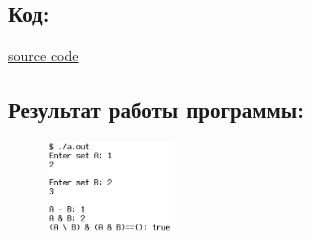 \documentclass[14pt,a4paper]{article}
\begin{document}
\subsection{Код:}

\href{https://raw.githubusercontent.com/John1400800/stuff/refs/heads/main/c_learning/home_works/task19_2.cpp}{source code}
\subsection{Результат работы программы:}
\begin{figure}[H]
  \includegraphics[width=0.3\textwidth]{data/demo19_2.png}
\end{figure}
\end{document}
